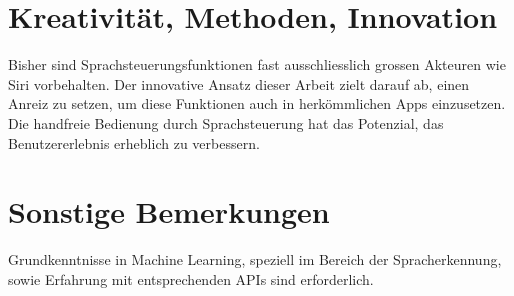 \documentclass[11pt,a4paper]{article}
\begin{document}
\section*{Kreativität, Methoden, Innovation}
Bisher sind Sprachsteuerungsfunktionen fast ausschliesslich grossen Akteuren wie Siri
vorbehalten. Der innovative Ansatz dieser Arbeit zielt darauf ab, einen Anreiz zu setzen,
um diese Funktionen auch in herkömmlichen Apps einzusetzen. Die handfreie Bedienung durch
Sprachsteuerung hat das Potenzial, das Benutzererlebnis erheblich zu verbessern.

\section*{Sonstige Bemerkungen}
Grundkenntnisse in Machine Learning, speziell im Bereich der Spracherkennung, sowie
Erfahrung mit entsprechenden APIs sind erforderlich.
\end{document}
